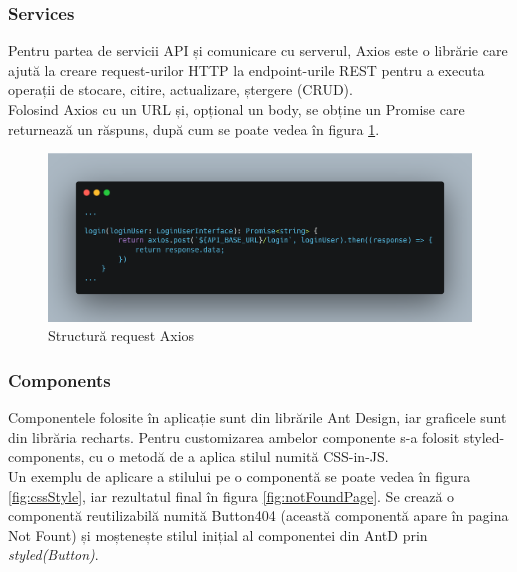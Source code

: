 \subsubsection{Services}
Pentru partea de servicii API și comunicare cu serverul, Axios este o librărie care ajută la creare request-urilor HTTP la endpoint-urile REST pentru a executa operații de stocare, citire, actualizare, ștergere (CRUD).\\
Folosind Axios cu un URL și, opțional un body, se obține un Promise care returnează un răspuns, după cum se poate vedea în figura \ref{fig:axiosPromise}.
\begin{figure}[h]
	\centering
	\includegraphics[width=150mm]{figs/axiosPromise.png}
	\caption{Structură request Axios}
	\label{fig:axiosPromise}
\end{figure}

\subsubsection{Components}
Componentele folosite în aplicație sunt din librările Ant Design, iar graficele sunt din librăria recharts. Pentru customizarea ambelor componente s-a folosit styled-components, cu o metodă de a aplica stilul numită CSS-in-JS. \\
Un exemplu de aplicare a stilului pe o componentă se poate vedea în figura \ref{fig:cssStyle}, iar rezultatul final în figura \ref{fig:notFoundPage}.
Se crează o componentă reutilizabilă numită Button404 (această componentă apare în pagina Not Fount) și moștenește stilul inițial al componentei din AntD prin {\it styled(Button)}. \\

